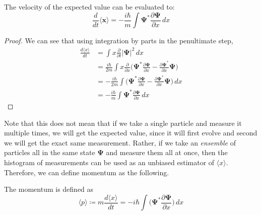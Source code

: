\documentclass{article}
\begin{document}
    \begin{theorem} 
      The velocity of the expected value can be evaluated to: 
      \begin{equation} 
        \frac{d}{dt} \langle \mathbf{x} \rangle = -\frac{i \hbar}{m} \int \boldsymbol{\Psi}^\ast \frac{\partial \boldsymbol{\Psi}}{\partial x} \,dx
      \end{equation}
    \end{theorem}
    \begin{proof} 
      We can see that using integration by parts in the penultimate step, 
      \begin{align} 
        \frac{d \langle x \rangle}{dt} & = \int x \frac{\partial}{\partial t} |\boldsymbol{\Psi}|^2 \,dx \\
                                       & = \frac{i \hbar}{2m} \int x \frac{\partial}{\partial x} \bigg( \boldsymbol{\Psi}^\ast \frac{\partial \boldsymbol{\Psi}}{\partial x} - \frac{\partial \boldsymbol{\Psi}^\ast}{\partial x} \boldsymbol{\Psi} \bigg) \\
                                       & = - \frac{i \hbar}{2m} \int \bigg( \boldsymbol{\Psi}^\ast \frac{\partial \boldsymbol{\Psi}}{\partial x} - \frac{\partial \boldsymbol{\Psi}^\ast}{\partial x} \boldsymbol{\Psi} \bigg) \,dx \\
                                       & = -\frac{i \hbar}{m} \int \boldsymbol{\Psi}^\ast \frac{\partial \boldsymbol{\Psi}}{\partial x} \,dx
      \end{align}
    \end{proof}

    Note that this does not mean that if we take a single particle and measure it multiple times, we will get the expected value, since it will first evolve and second we will get the exact same measurement. Rather, if we take an \textit{ensemble} of particles all in the same state $\mathbf{\Psi}$ and measure them all at once, then the histogram of measurements can be used as an unbiased estimator of $\langle x \rangle$. Therefore, we can define momentum as the following. 

    \begin{definition}[Momentum]
      The momentum is defined as 
      \begin{equation} 
        \langle p \rangle \coloneqq m \frac{d \langle x \rangle}{dt} = - i\hbar \int \bigg( \boldsymbol{\Psi}^\ast \frac{\partial \boldsymbol{\Psi}}{\partial x} \bigg)  \,dx
      \end{equation}
    \end{definition}
\end{document}
